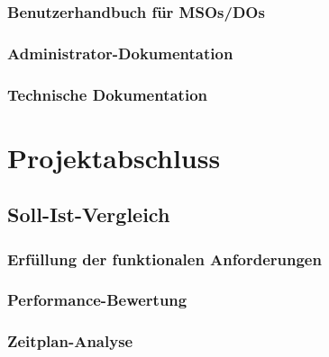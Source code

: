 \documentclass[11pt,a4paper]{article}
\begin{document}
\subsubsection{Benutzerhandbuch für MSOs/DOs}

\subsubsection{Administrator-Dokumentation}

\subsubsection{Technische Dokumentation}

\newpage
\section{Projektabschluss}

\subsection{Soll-Ist-Vergleich}

\subsubsection{Erfüllung der funktionalen Anforderungen}

\subsubsection{Performance-Bewertung}

\subsubsection{Zeitplan-Analyse}
\end{document}
